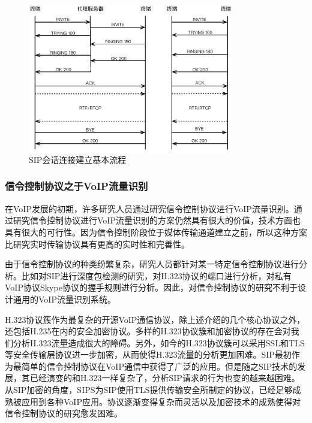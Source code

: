 \begin{figure}[thb]
\begin{center}
\includegraphics[width=0.8\textwidth]{figures/SIP.eps}
\caption{SIP会话连接建立基本流程}\label{fig:SIP}
\end{center}
\end{figure}


\subsubsection{信令控制协议之于VoIP流量识别}
在VoIP发展的初期，许多研究人员通过研究信令控制协议进行VoIP流量识别。通过研究信令控制协议进行VoIP流量识别的方案仍然具有很大的价值，技术方面也具有很大的可行性。因为信令控制阶段位于媒体传输通道建立之前，所以这种方案比研究实时传输协议具有更高的实时性和完善性。

由于信令控制协议的种类纷繁复杂，研究人员都针对某一特定信令控制协议进行分析。比如对SIP进行深度包检测的研究，对H.323协议的端口进行分析，对私有VoIP协议Skype协议的握手规则进行分析。因此，对信令控制协议的研究不利于设计通用的VoIP流量识别系统。

H.323协议簇作为最复杂的开源VoIP通信协议，除上述介绍的几个核心协议之外，还包括H.235在内的安全加密协议。多样的H.323协议簇和加密协议的存在会对我们分析H.323流量造成很大的障碍。另外，如今的H.323协议簇可以采用SSL和TLS等安全传输层协议进一步加密，从而使得H.323流量的分析更加困难。SIP最初作为最简单的信令控制协议在VoIP通信中获得了广泛的应用。但是随之SIP技术的发展，其已经演变的和H.323一样复杂了，分析SIP请求的行为也变的越来越困难。从SIP加密的角度，SIPS为SIP使用TLS提供传输安全所制定的协议，已经足够成熟被应用到各种VoIP应用。协议逐渐变得复杂而灵活以及加密技术的成熟使得对信令控制协议的研究愈发困难。


